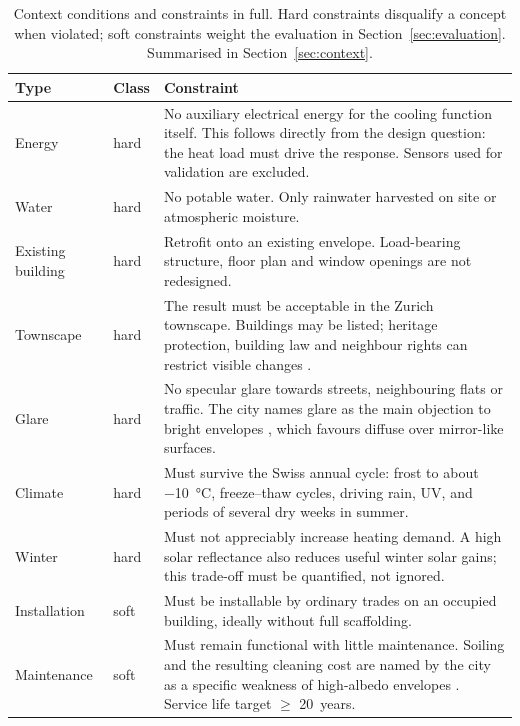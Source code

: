 \begin{table}[htbp]
\centering
\caption{Context conditions and constraints in full. Hard constraints
disqualify a concept when violated; soft constraints weight the evaluation in
Section~\ref{sec:evaluation}. Summarised in Section~\ref{sec:context}.}
\label{tab:constraints}
\renewcommand{\arraystretch}{1.2}
\small
\begin{tabularx}{\textwidth}{L{2.3cm} L{1.4cm} X}
\toprule
\textbf{Type} & \textbf{Class} & \textbf{Constraint} \\
\midrule
Energy & hard & No auxiliary electrical energy for the cooling function itself. This follows directly from the design question: the heat load must drive the response. Sensors used for validation are excluded. \\
Water & hard & No potable water. Only rainwater harvested on site or atmospheric moisture. \\
Existing building & hard & Retrofit onto an existing envelope. Load-bearing structure, floor plan and window openings are not redesigned. \\
Townscape & hard & The result must be acceptable in the Zurich townscape. Buildings may be listed; heritage protection, building law and neighbour rights can restrict visible changes \parencite[128]{stadtzuerich2020}. \\
Glare & hard & No specular glare towards streets, neighbouring flats or traffic. The city names glare as the main objection to bright envelopes \parencite[128]{stadtzuerich2020}, which favours diffuse over mirror-like surfaces. \\
Climate & hard & Must survive the Swiss annual cycle: frost to about \qty{-10}{\celsius}, freeze--thaw cycles, driving rain, UV, and periods of several dry weeks in summer. \\
Winter & hard & Must not appreciably increase heating demand. A high solar reflectance also reduces useful winter solar gains; this trade-off must be quantified, not ignored. \\
Installation & soft & Must be installable by ordinary trades on an occupied building, ideally without full scaffolding.  \\
Maintenance & soft & Must remain functional with little maintenance. Soiling and the resulting cleaning cost are named by the city as a specific weakness of high-albedo envelopes \parencite[128]{stadtzuerich2020}. Service life target $\geq$ \qty{20}{years}. \\

\end{tabularx}
\end{table}
